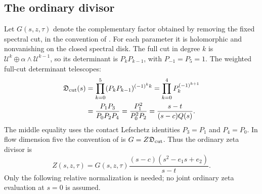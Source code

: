 \documentclass[11pt,letterpaper,reqno]{amsart}
\theoremstyle{remark}
\newcommand{\cU}{\mathcal U}
\begin{document}
\subsection{The ordinary divisor}
Let $G(s,z,\tau)$ denote the complementary factor obtained by
removing the fixed spectral cut, in the convention of
\cite[(6.4)--(6.5)]{CD}. For each parameter it is holomorphic and
nonvanishing on the closed spectral disk. The full cut in degree $k$
is $\cU^k\oplus\alpha\wedge\cU^{k-1}$, so its determinant is
$P_kP_{k-1}$, with $P_{-1}=P_5=1$. The weighted full-cut determinant
telescopes:
\begin{align}\label{fulltelescoping}
 \mathfrak D_{\rm cut}(s)
 &=\prod_{k=0}^{5}(P_kP_{k-1})^{(-1)^k k}
   =\prod_{k=0}^{4}P_k^{(-1)^{k+1}}\notag\\
 &=\frac{P_1P_3}{P_0P_2P_4}
   =\frac{P_1^2}{P_0^2P_2}
   =\frac{s-t}{(s-c)Q(s)}.
\end{align}
The middle equality uses the contact Lefschetz identities $P_3=P_1$
and $P_4=P_0$. In flow dimension five the convention of
\cite[(6.5)]{CD} is $G=Z\mathfrak D_{\rm cut}$. Thus the ordinary
zeta divisor is
\begin{equation}\label{divisor}
 Z(s,z,\tau)=G(s,z,\tau)
   \frac{(s-c)(s^2-e_1s+e_2)}{s-t}.
\end{equation}
Only the following relative normalization is needed; no joint ordinary
zeta evaluation at $s=0$ is assumed.
\end{document}
